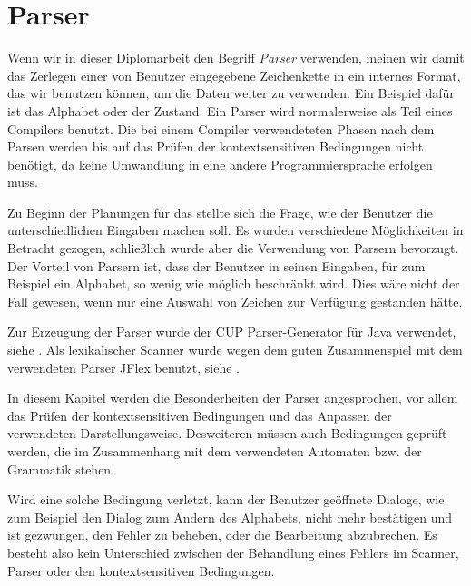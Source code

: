 \section{Parser}\label{Parser}

Wenn wir in dieser Diplomarbeit den Begriff \textit{Parser} verwenden, meinen wir
damit das Zerlegen einer von Benutzer eingegebene Zeichenkette in ein internes
Format, das wir benutzen können, um die Daten weiter zu verwenden. Ein Beispiel
dafür ist das Alphabet oder der Zustand. Ein Parser wird normalerweise als Teil
eines Compilers benutzt. Die bei einem Compiler verwendeteten Phasen nach dem
Parsen werden bis auf das Prüfen der kontextsensitiven Bedingungen nicht
benötigt, da keine Umwandlung in eine andere Programmiersprache erfolgen
muss.\vspace{10pt}

Zu Beginn der Planungen für das \gtitool stellte sich die Frage, wie der Benutzer
die unterschiedlichen Eingaben machen soll. Es wurden verschiedene
Möglichkeiten in Betracht gezogen, schließlich wurde aber die Verwendung von
Parsern bevorzugt. Der Vorteil von Parsern ist, dass der Benutzer in seinen
Eingaben, für zum Beispiel ein Alphabet, so wenig wie möglich beschränkt wird.
Dies wäre nicht der Fall gewesen, wenn nur eine Auswahl von Zeichen zur
Verfügung gestanden hätte.\vspace{10pt}

Zur Erzeugung der Parser wurde der CUP Parser-Generator für Java verwendet, siehe
\cite{java-cup}. Als lexikalischer Scanner wurde wegen dem guten Zusammenspiel
mit dem verwendeten Parser JFlex benutzt, siehe \cite{jflex}.\vspace{10pt}

In diesem Kapitel werden die Besonderheiten der Parser angesprochen, vor allem
das Prüfen der kontextsensitiven Bedingungen und das Anpassen der verwendeten
Darstellungsweise. Desweiteren müssen auch Bedingungen geprüft werden, die im
Zusammenhang mit dem verwendeten Automaten bzw. der Grammatik
stehen.\vspace{10pt}

Wird eine solche Bedingung verletzt, kann der Benutzer geöffnete Dialoge, wie zum
Beispiel den Dialog zum Ändern des Alphabets, nicht mehr bestätigen und ist
gezwungen, den Fehler zu beheben, oder die Bearbeitung abzubrechen. Es besteht
also kein Unterschied zwischen der Behandlung eines Fehlers im Scanner, Parser
oder den kontextsensitiven Bedingungen.\vspace{10pt}


